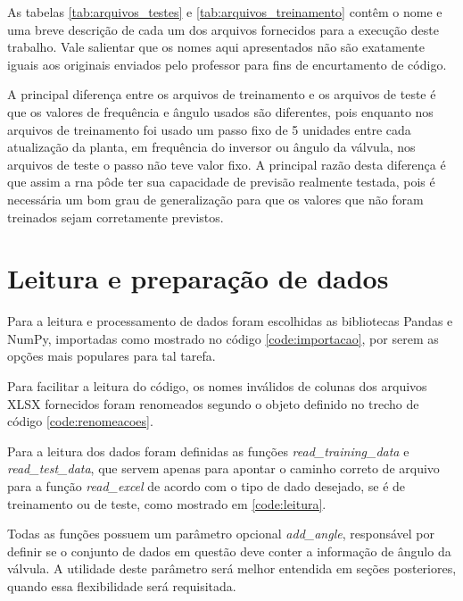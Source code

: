 \documentclass[12pt]{article}
\begin{document}
As tabelas \ref{tab:arquivos_testes} e \ref{tab:arquivos_treinamento} contêm o nome e uma breve descrição de cada um dos arquivos fornecidos para a execução deste trabalho. Vale salientar que os nomes aqui apresentados não são exatamente iguais aos originais enviados pelo professor para fins de encurtamento de código.

A principal diferença entre os arquivos de treinamento e os arquivos de teste é que os valores de frequência e ângulo usados são diferentes, pois enquanto nos arquivos de treinamento foi usado um passo fixo de 5 unidades entre cada atualização da planta, em frequência do inversor ou ângulo da válvula, nos arquivos de teste o passo não teve valor fixo.
A principal razão desta diferença é que assim a \acrshort{rna} pôde ter sua capacidade de previsão realmente testada, pois é necessária um bom grau de generalização para que os valores que não foram treinados sejam corretamente previstos.

\section{Leitura e preparação de dados}



Para a leitura e processamento de dados foram escolhidas as bibliotecas Pandas e NumPy, importadas como mostrado no código \ref{code:importacao}, por serem as opções mais populares para tal tarefa.



Para facilitar a leitura do código, os nomes inválidos de colunas dos arquivos XLSX fornecidos foram renomeados segundo o objeto definido no trecho de código \ref{code:renomeacoes}.



Para a leitura dos dados foram definidas as funções \textit{read\_training\_data} e \textit{read\_test\_data}, que servem apenas para apontar o caminho correto de arquivo para a função \textit{read\_excel} de acordo com o tipo de dado desejado, se é de treinamento ou de teste, como mostrado em \ref{code:leitura}.

Todas as funções possuem um parâmetro opcional \textit{add\_angle}, responsável por definir se o conjunto de dados em questão deve conter a informação de ângulo da válvula. A utilidade deste parâmetro será melhor entendida em seções posteriores, quando essa flexibilidade será requisitada.
\end{document}
